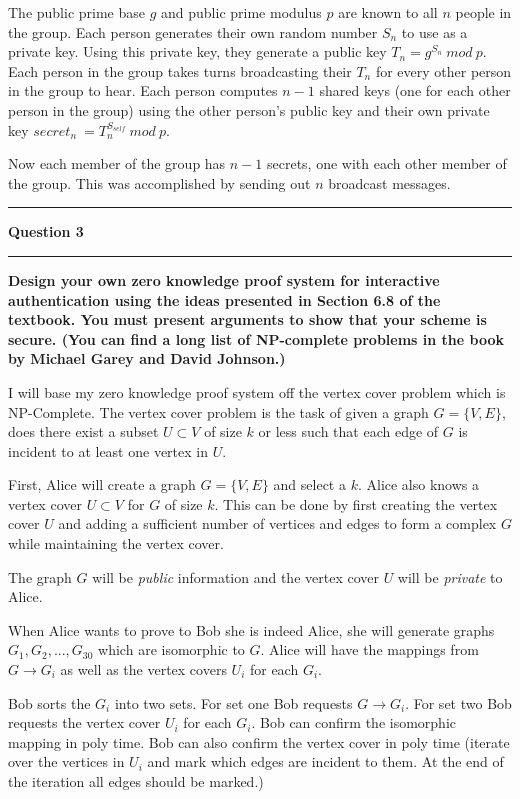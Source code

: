 \documentclass[11pt]{article}
\newcommand\question[2]{\vspace{.25in}\hrule\textbf{#1}\vspace{.5em}\hrule\vspace{.10in}}
\renewcommand\part[1]{\vspace{.10in}\textbf{(#1)}}
\begin{document}
The public prime base $g$ and public prime modulus $p$ are known to all $n$ people in the group. Each person generates their own random number $S_n$ to use as a private key. Using this private key, they generate a public key $T_n = g^{S_n} \ mod \ p$. Each person in the group takes turns broadcasting their $T_n$ for every other person in the group to hear. Each person computes $n-1$ shared keys (one for each other person in the group) using the other person's public key and their own private key $secret_n \ = T_n^{S_{self}} \ mod \ p$.

Now each member of the group has $n - 1$ secrets, one with each other member of the group. This was accomplished by sending out $n$ broadcast messages.

\question{Question 3}

\part{a} \textbf{Design your own zero knowledge proof system for interactive authentication using the ideas presented in Section 6.8 of the textbook. You must present arguments to show that your scheme is secure. (You can find a long list of NP-complete problems in the book by Michael Garey and David Johnson.)}

I will base my zero knowledge proof system off the vertex cover problem which is NP-Complete. The vertex cover problem is the task of given a graph $G = \{V, E\}$, does there exist a subset $U \subset V$ of size $k$ or less such that each edge of $G$ is incident to at least one vertex in $U$.

First, Alice will create a graph $G = \{V, E\}$ and select a $k$. Alice also knows a vertex cover $U \subset V$ for $G$ of size $k$. This can be done by first creating the vertex cover $U$ and adding a sufficient number of vertices and edges to form a complex $G$ while maintaining the vertex cover.

The graph $G$ will be \textit{public} information and the vertex cover $U$ will be \textit{private} to Alice.

When Alice wants to prove to Bob she is indeed Alice, she will generate graphs $G_1, G_2, ..., G_{30}$ which are isomorphic to $G$. Alice will have the mappings from $G \rightarrow G_i$ as well as the vertex covers $U_i$ for each $G_i$.

Bob sorts the $G_i$ into two sets. For set one Bob requests $G \rightarrow G_i$. For set two Bob requests the vertex cover $U_i$ for each $G_i$. Bob can confirm the isomorphic mapping in poly time. Bob can also confirm the vertex cover in poly time (iterate over the vertices in $U_i$ and mark which edges are incident to them. At the end of the iteration all edges should be marked.)
\end{document}

